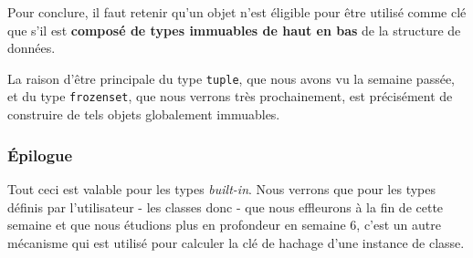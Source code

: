     Pour conclure, il faut retenir qu'un objet n'est éligible pour être
utilisé comme clé que s'il est \textbf{composé de types immuables de
haut en bas} de la structure de données.

    La raison d'être principale du type \texttt{tuple}, que nous avons vu la
semaine passée, et du type \texttt{frozenset}, que nous verrons très
prochainement, est précisément de construire de tels objets globalement
immuables.

    \hypertarget{uxe9pilogue}{%
\subsubsection{Épilogue}\label{uxe9pilogue}}

    Tout ceci est valable pour les types \emph{built-in}. Nous verrons que
pour les types définis par l'utilisateur - les classes donc - que nous
effleurons à la fin de cette semaine et que nous étudions plus en
profondeur en semaine 6, c'est un autre mécanisme qui est utilisé pour
calculer la clé de hachage d'une instance de classe.


    
    
    
